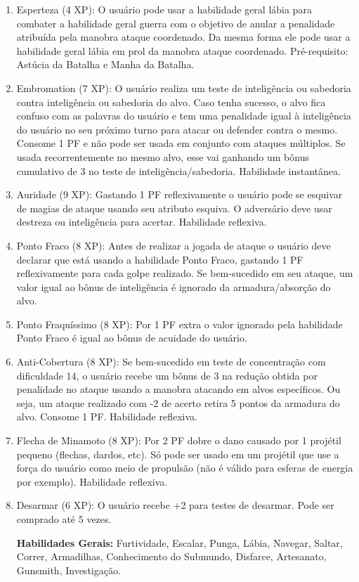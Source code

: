 \begin{enumerate}
	\item Esperteza (4 XP): O usuário pode usar a habilidade geral lábia para combater a habilidade geral guerra com o objetivo de anular a penalidade atribuída pela manobra ataque coordenado. Da mesma forma ele pode usar a habilidade geral lábia em prol da manobra ataque coordenado. Pré-requisito: Astúcia da Batalha e Manha da Batalha.
	
	\item Embromation (7 XP): O usuário realiza um teste de inteligência ou sabedoria contra inteligência ou sabedoria do alvo. Caso tenha sucesso, o alvo fica confuso com as palavras do usuário e tem uma penalidade igual à inteligência do usuário no seu próximo turno para atacar ou defender contra o mesmo. Consome 1 PF e não pode ser usada em conjunto com ataques múltiplos. Se usada recorrentemente no mesmo alvo, esse vai ganhando um bônus cumulativo de 3 no teste de inteligência/sabedoria. Habilidade instantânea.

  \item Auridade (9 XP): Gastando 1 PF reflexivamente o usuário pode se esquivar de magias de ataque usando seu atributo esquiva. O adversário deve usar destreza ou inteligência para acertar. Habilidade reflexiva.   

  \item Ponto Fraco (8 XP): Antes de realizar a jogada de ataque o usuário deve declarar que está usando a habilidade Ponto Fraco, gastando 1 PF reflexivamente para cada golpe realizado. Se bem-sucedido em seu ataque, um valor igual ao bônus de inteligência é ignorado da armadura/absorção do alvo.

  \item Ponto Fraquíssimo (8 XP): Por 1 PF extra o valor ignorado pela habilidade Ponto Fraco é igual ao bônus de acuidade do usuário.

	\item Anti-Cobertura (8 XP): Se bem-sucedido em teste de concentração com dificuldade 14, o usuário recebe um bônus de 3 na redução obtida por penalidade no ataque usando a manobra atacando em alvos específicos. Ou seja, um ataque realizado com -2 de acerto retira 5 pontos da armadura do alvo. Consome 1 PF. Habilidade reflexiva. 	

	\item Flecha de Minamoto (8 XP): Por 2 PF dobre o dano causado por 1 projétil pequeno (flechas, dardos, etc). Só pode ser usado em um projétil que use a força do usuário como meio de propulsão (não é válido para esferas de energia por exemplo). Habilidade reflexiva.

 	\item Desarmar (6 XP): O usuário recebe +2 para testes de desarmar. Pode ser comprado até 5 vezes. 	

\textbf{Habilidades Gerais:} Furtividade, Escalar, Punga, Lábia, Navegar, Saltar, Correr, Armadilhas, Conhecimento do Submundo, Disfarce, Artesanato, Gunsmith, Investigação.
 
\end{enumerate}
 
